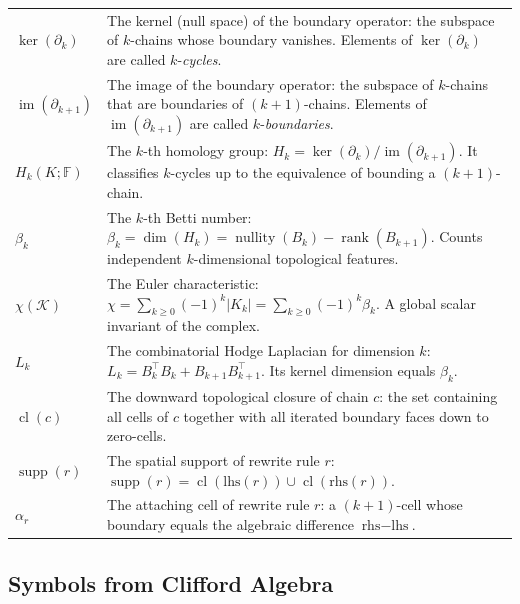 \documentclass[manuscript, nonacm, review=false]{acmart}
\theoremstyle{definition}
\theoremstyle{plain}
\newcommand{\K}{\mathcal{K}}
\newcommand{\F}{\mathbb{F}}
\newcommand{\supp}{\operatorname{supp}}
\newcommand{\cl}{\operatorname{cl}}
\newcommand{\rank}{\operatorname{rank}}
\newcommand{\nullity}{\operatorname{nullity}}
\newcommand{\img}{\operatorname{im}}
\begin{document}
\begin{longtable}{@{}p{2.8cm}p{10cm}@{}}
$\ker(\partial_k)$ & The kernel (null space) of the boundary operator: the subspace of $k$-chains whose boundary vanishes. Elements of $\ker(\partial_k)$ are called $k$-\emph{cycles}. \\

$\img(\partial_{k+1})$ & The image of the boundary operator: the subspace of $k$-chains that are boundaries of $(k+1)$-chains. Elements of $\img(\partial_{k+1})$ are called $k$-\emph{boundaries}. \\

$H_k(K; \F)$ & The $k$-th homology group: $H_k = \ker(\partial_k) / \img(\partial_{k+1})$. It classifies $k$-cycles up to the equivalence of bounding a $(k+1)$-chain. \\

$\beta_k$ & The $k$-th Betti number: $\beta_k = \dim(H_k) = \nullity(B_k) - \rank(B_{k+1})$. Counts independent $k$-dimensional topological features. \\

$\chi(\K)$ & The Euler characteristic: $\chi = \sum_{k \geq 0}(-1)^k |K_k| = \sum_{k \geq 0}(-1)^k \beta_k$. A global scalar invariant of the complex. \\

$L_k$ & The combinatorial Hodge Laplacian for dimension $k$: $L_k = B_k^\top B_k + B_{k+1} B_{k+1}^\top$. Its kernel dimension equals $\beta_k$. \\

$\cl(c)$ & The downward topological closure of chain $c$: the set containing all cells of $c$ together with all iterated boundary faces down to zero-cells. \\

$\supp(r)$ & The spatial support of rewrite rule $r$: $\supp(r) = \cl(\text{lhs}(r)) \cup \cl(\text{rhs}(r))$. \\

$\alpha_r$ & The attaching cell of rewrite rule $r$: a $(k+1)$-cell whose boundary equals the algebraic difference $\text{rhs} - \text{lhs}$. \\

\end{longtable}


\subsection{Symbols from Clifford Algebra}
\label{subsec:symbols_clifford}
\end{document}
